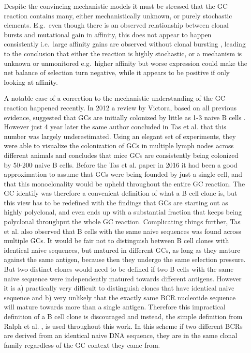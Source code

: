 Despite the convincing mechanistic models it must be stressed that the GC reaction contains many, either mechanistically unknown, or purely stochastic elements.
E.g.\ even though there is an observed relationship between clonal bursts and mutational gain in affinity, this does not appear to happen consistently i.e.\ large affinity gains are observed without clonal bursting \cite{tas2016visualizing}, leading to the conclusion that either the reaction is highly stochastic, or a mechanism is unknown or unmonitored e.g.\ higher affinity but worse expression could make the net balance of selection turn negative, while it appears to be positive if only looking at affinity.

A notable case of a correction to the mechanistic understanding of the GC reaction happened recently.
In 2012 a review by Victora, based on all previous evidence, suggested that GCs are initially colonized by little as 1-3 naive B cells \cite{victora2012germinal}.
However just 4 year later the same author concluded in Tas et al. \cite{tas2016visualizing} that this number was largely underestimated.
Using an elegant set of experiments, they were able to visualize the colonization of GCs in multiple lymph nodes across different animals and concludes that mice GCs are consistently being colonized by 50-200 naive B cells.
Before the Tas et al. paper in 2016 it had been a good approximation to assume that GCs were being founded by just a single cell, and that this monoclonality would be upheld throughout the entire GC reaction.
The GC identify was therefore a convenient definition of what a B cell clone is, but this view has to be redefined with the findings that GCs are starting out as highly polyclonal, and even ends up with a substantial fraction that keeps being polyclonal throughput the whole GC reaction.
Complicating things further, Tas et al. also observed that B cells with the same naive sequences was found across multiple GCs.
It would be fair not to distinguish between B cell clones with identical naive sequences, but matured in different GCs, as long as they mature against the same antigen, because then they undergo the same selection pressure.
But two distinct clones would need to be defined if two B cells with the same naive sequence were independently matured towards different antigens.
However it is a) practically very difficult to distinguish clones that have identical naive sequence and b) very unlikely that the exactly same BCR nucleotide sequence will mature towards more than a single antigen.
Therefore this impractical definition of a B cell clone is discouraged and instead, the simple definition from Ralph et al. \cite{ralph2016likelihood}, is used throughout this work.
In this scheme if two different BCRs are derived from an identical naive DNA sequence, they are in the same clonal family regardless of the GC context they came from.




